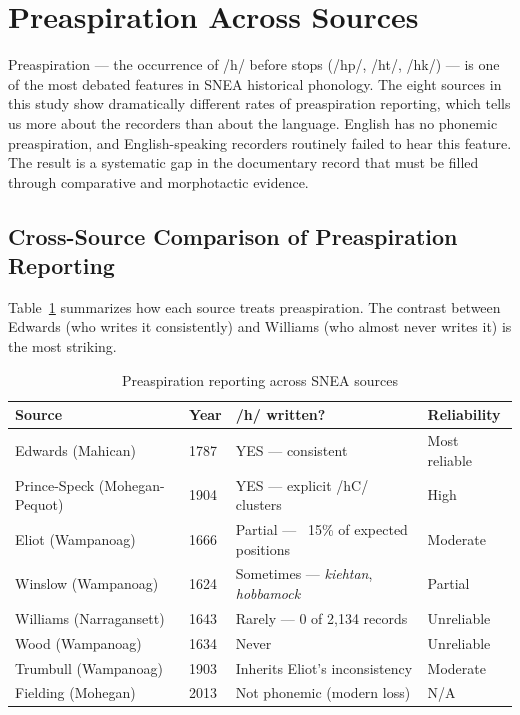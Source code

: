 
\section{Preaspiration Across Sources}
\label{sec:preaspiration}

Preaspiration --- the occurrence of /h/ before stops (/hp/, /ht/, /hk/) --- is
one of the most debated features in SNEA historical phonology. The eight
sources in this study show dramatically different rates of preaspiration
reporting, which tells us more about the recorders than about the language.
English has no phonemic preaspiration, and English-speaking recorders
routinely failed to hear this feature. The result is a systematic gap in the
documentary record that must be filled through comparative and morphotactic
evidence.

\subsection{Cross-Source Comparison of Preaspiration Reporting}

Table~\ref{tab:preaspiration-comparison} summarizes how each source treats
preaspiration. The contrast between Edwards (who writes it consistently) and
Williams (who almost never writes it) is the most striking.

\begin{table}[h]
\centering
\caption{Preaspiration reporting across SNEA sources}
\label{tab:preaspiration-comparison}
\begin{tabular}{llll}
\toprule
\textbf{Source} & \textbf{Year} & \textbf{/h/ written?} & \textbf{Reliability} \\
\midrule
Edwards (Mahican) & 1787 & YES --- consistent & Most reliable \\
Prince-Speck (Mohegan-Pequot) & 1904 & YES --- explicit /hC/ clusters & High \\
Eliot (Wampanoag) & 1666 & Partial --- ~15\% of expected positions & Moderate \\
Winslow (Wampanoag) & 1624 & Sometimes --- \textit{kiehtan}, \textit{hobbamock} & Partial \\
Williams (Narragansett) & 1643 & Rarely --- 0 of 2,134 records & Unreliable \\
Wood (Wampanoag) & 1634 & Never & Unreliable \\
Trumbull (Wampanoag) & 1903 & Inherits Eliot's inconsistency & Moderate \\
Fielding (Mohegan) & 2013 & Not phonemic (modern loss) & N/A \\
\bottomrule
\end{tabular}
\end{table}


